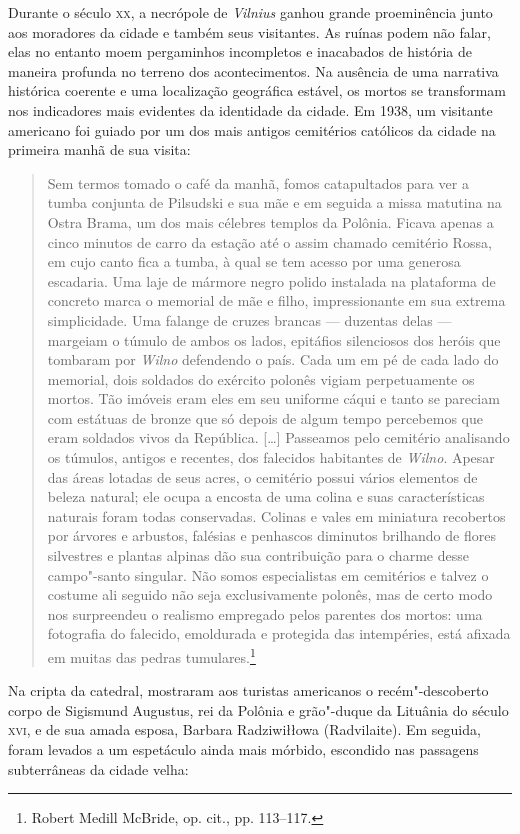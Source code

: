 Durante o século \textsc{xx}, a necrópole de \textit{Vilnius} ganhou grande proeminência
junto aos moradores da cidade e também seus visitantes. As ruínas podem
não falar, elas no entanto moem pergaminhos incompletos e inacabados de
história de maneira profunda no terreno dos acontecimentos. Na ausência
de uma narrativa histórica coerente e uma localização geográfica
estável, os mortos se transformam nos indicadores mais evidentes da
identidade da cidade. Em 1938, um visitante americano foi guiado por um
dos mais antigos cemitérios católicos da cidade na primeira manhã de sua
visita:

\begin{quote}
Sem termos tomado o café da manhã, fomos catapultados para ver a tumba
conjunta de Pilsudski e sua mãe e em seguida a missa matutina na Ostra
Brama, um dos mais célebres templos da Polônia. Ficava apenas a cinco
minutos de carro da estação até o assim chamado cemitério Rossa, em cujo
canto fica a tumba, à qual se tem acesso por uma generosa escadaria. Uma
laje de mármore negro polido instalada na plataforma de concreto marca o
memorial de mãe e filho, impressionante em sua extrema simplicidade. Uma
falange de cruzes brancas --- duzentas delas --- margeiam o túmulo de ambos
os lados, epitáfios silenciosos dos heróis que tombaram por \textit{Wilno}
defendendo o país. Cada um em pé de cada lado do memorial, dois soldados
do exército polonês vigiam perpetuamente os mortos. Tão imóveis eram
eles em seu uniforme cáqui e tanto se pareciam com estátuas de bronze
que só depois de algum tempo percebemos que eram soldados vivos da
República. [\ldots{}] Passeamos pelo cemitério analisando os túmulos,
antigos e recentes, dos falecidos habitantes de \textit{Wilno}. Apesar das áreas
lotadas de seus acres, o cemitério possui vários elementos de beleza
natural; ele ocupa a encosta de uma colina e suas características
naturais foram todas conservadas. Colinas e vales em miniatura
recobertos por árvores e arbustos, falésias e penhascos diminutos
brilhando de flores silvestres e plantas alpinas dão sua contribuição
para o charme desse campo"-santo singular. Não somos especialistas em
cemitérios e talvez o costume ali seguido não seja exclusivamente
polonês, mas de certo modo nos surpreendeu o realismo empregado pelos
parentes dos mortos: uma fotografia do falecido, emoldurada e protegida
das intempéries, está afixada em muitas das pedras tumulares.\footnote{Robert Medill McBride, op. cit., pp. 113--117.} 
\end{quote}

Na cripta da catedral, mostraram aos turistas americanos o
recém"-descoberto corpo de Sigismund Augustus, rei da Polônia e
grão"-duque da Lituânia do século \textsc{xvi}, e de sua amada esposa, Barbara
Radziwiłłowa (Radvilaite). Em seguida, foram levados a um espetáculo
ainda mais mórbido, escondido nas passagens subterrâneas da cidade
velha:

